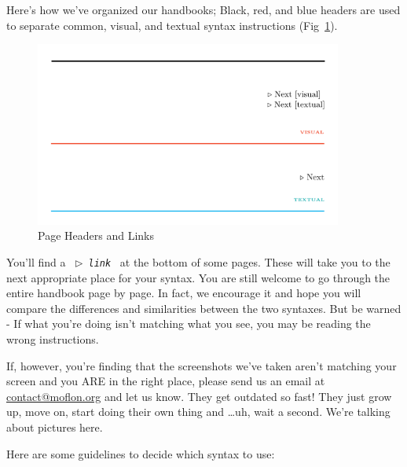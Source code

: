 \genHeader 

Here's how we've organized our handbooks; Black, red, and blue headers are used to separate common, visual, and textual syntax
instructions (Fig~\ref{pageExamples}).

\begin{figure}[htbp] \centering
  \includegraphics[width=0.9\textwidth]{headers}
	\caption{Page Headers and Links} 
	\label{pageExamples} 
\end{figure}

You'll find a \mbox{ $\triangleright$ {\texttt {\emph{link}}} } at the bottom of some pages. These will take you to the next
appropriate place for your syntax. You are still welcome to go through the entire handbook page by page. In fact, we encourage it and hope you will compare the
differences and similarities between the two syntaxes. But be warned - If what you're doing isn't matching what you see, you may be reading the wrong
instructions.


If, however, you're finding that the screenshots we've taken aren't matching your screen and you ARE in the right place, please send us an email at
\href{mailto:contact@moflon.org}{contact@moflon.org} and let us know. They get outdated so fast! They just grow up, move on, start doing their own thing and
\ldots uh, wait a second. We're talking about pictures here.

Here are some guidelines to decide which syntax to use:

